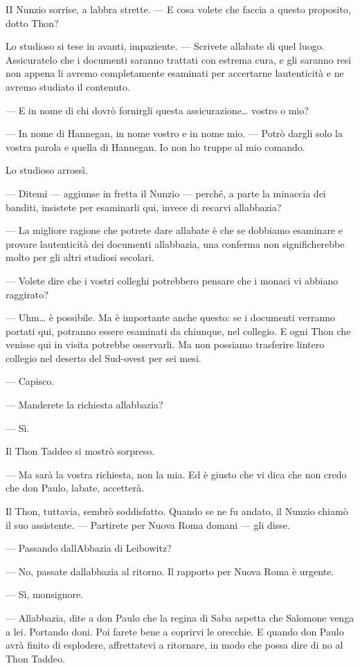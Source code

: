 	II Nunzio sorrise, a labbra strette. --- E cosa volete che faccia a
	questo proposito, dotto Thon?
	
	Lo studioso si tese in avanti, impaziente. --- Scrivete
	all\textquotesingle abate di quel luogo. Assicuratelo che i documenti
	saranno trattati con estrema cura, e gli saranno resi non appena li
	avremo completamente esaminati per accertarne
	l\textquotesingle autenticità e ne avremo studiato il contenuto.
	
	--- E in nome di chi dovrò fornirgli questa assicurazione\ldots{} vostro
	o mio?
	
	--- In nome di Hannegan, in nome vostro e in nome mio. --- Potrò dargli
	solo la vostra parola e quella di Hannegan. Io non ho truppe al mio
	comando.
	
	Lo studioso arrossì.
	
	--- Ditemi --- aggiunse in fretta il Nunzio --- perché, a parte la
	minaccia dei banditi, insistete per esaminarli qui, invece di recarvi
	all\textquotesingle abbazia?
	
	--- La migliore ragione che potrete dare all\textquotesingle abate è che
	se dobbiamo esaminare e provare l\textquotesingle autenticità dei
	documenti all\textquotesingle abbazia, una conferma non significherebbe
	molto per gli altri studiosi secolari.
	
	--- Volete dire che i vostri colleghi potrebbero pensare che i monaci vi
	abbiano raggirato?
	
	--- Uhm\ldots{} è possibile. Ma è importante anche questo: se i
	documenti verranno portati qui, potranno essere esaminati da chiunque,
	nel collegio. E ogni Thon che venisse qui in visita potrebbe osservarli.
	Ma non possiamo trasferire l\textquotesingle intero collegio nel deserto
	del Sud-ovest per sei mesi.
	
	--- Capisco.
	
	--- Manderete la richiesta all\textquotesingle abbazia?
	
	--- Sì.
	
	Il Thon Taddeo si mostrò sorpreso.
	
	--- Ma sarà la vostra richiesta, non la mia. Ed è giusto che vi dica che
	non credo che don Paulo, l\textquotesingle abate, accetterà.
	
	Il Thon, tuttavia, sembrò soddisfatto. Quando se ne fu andato, il Nunzio
	chiamò il suo assistente. --- Partirete per Nuova Roma domani --- gli
	disse.
	
	--- Passando dall\textquotesingle Abbazia di Leibowitz?
	
	--- No, passate dall\textquotesingle abbazia al ritorno. Il rapporto per
	Nuova Roma è urgente.
	
	--- Sì, monsignore.
	
	--- All\textquotesingle abbazia, dite a don Paulo che la regina di Saba
	aspetta che Salomone venga a lei. Portando doni. Poi farete bene a
	coprirvi le orecchie. E quando don Paulo avrà finito di esplodere,
	affrettatevi a ritornare, in modo che possa dire di no al Thon Taddeo.
	